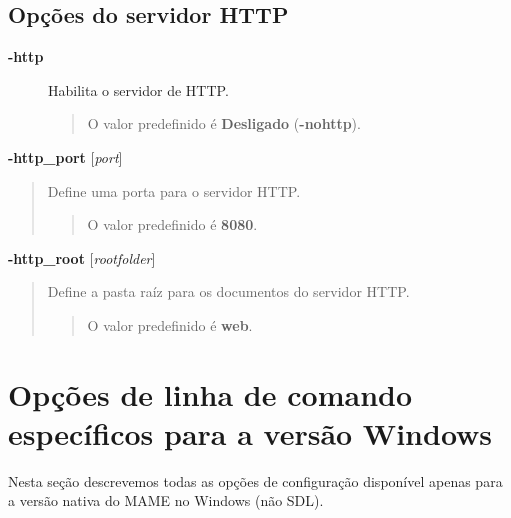 \documentclass[letterpaper,10pt,brazil]{sphinxmanual}
\begin{document}
\subsection{Opções do servidor HTTP}
\label{commandline/commandline-all:opcoes-do-servidor-http}\label{commandline/commandline-all:mame-commandline-http}\begin{description}
\item[{\textbf{-http}}] \leavevmode
Habilita o servidor de HTTP.
\begin{quote}

O valor predefinido é \textbf{Desligado} (\textbf{-nohttp}).
\end{quote}

\end{description}
\label{commandline/commandline-all:mame-commandline-httpport}
\textbf{-http\_port} {[}\emph{port}{]}
\begin{quote}

Define uma porta para o servidor HTTP.
\begin{quote}

O valor predefinido é \textbf{8080}.
\end{quote}
\end{quote}
\label{commandline/commandline-all:mame-commandline-httproot}
\textbf{-http\_root} {[}\emph{rootfolder}{]}
\begin{quote}

Define a pasta raíz para os documentos do servidor HTTP.
\begin{quote}

O valor predefinido é \textbf{web}.
\end{quote}
\end{quote}
\clearpage

\section{Opções de linha de comando específicos para a versão Windows}
\label{commandline/windowsconfig:opcoes-de-linha-de-comando-especificos-para-a-versao-windows}\label{commandline/windowsconfig::doc}
Nesta seção descrevemos todas as opções de configuração disponível
apenas para a versão nativa do MAME no Windows (não SDL).
\end{document}

